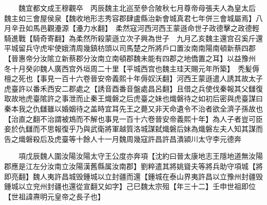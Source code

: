 　　魏宜都文成王穆觀卒　丙辰魏主北巡至參合陂秋七月尊帝母張夫人為皇太后　魏主如三會屋侯泉【魏收地形志秀容郡肆盧縣治新會城真君七年併三會城屬焉】八月辛丑如馬邑觀灅源【灅力水翻】　柔然寇河西河西王蒙遜命世子政德擊之政德輕騎進戰【騎奇寄翻】為柔然所殺蒙遜立次子興為世子　九月乙亥魏主還宫召奚斤還平城留兵守虎牢使娥清周幾鎮枋頭以司馬楚之所將戶口置汝南南陽南頓新蔡四郡【晉惠帝分汝隂立新蔡郡分汝南立南頓郡魏未能有四郡之地僑置之耳】以益豫州　冬十月癸卯魏人廣西宫外垣周二十里【平城西宫也魏主珪天賜元年所築】　秃髪傉檀之死也【事見一百十六卷晉安帝義熙十年傉奴沃翻】河西王蒙遜遣人誘其故太子虎臺許以番禾西安二郡處之【誘音酉番音盤處昌呂翻】且借之兵使伐秦報其父讎復取故地虎臺隂許之事泄而止秦王熾磐之后虎臺之妹也熾磐待之如初后密與虎臺謀曰秦本我之仇讎雖以婚姻待之盖時宜耳先王之薨又非天命遺令不治者欲全濟子孫故也【治直之翻不治謂被鴆而不解也事見一百十六卷晉安帝義熙十年】為人子者豈可臣妾於仇讎而不思報復乎乃與武衛將軍越質洛城謀弑熾磐后妹為熾磐左夫人知其謀而告之熾磐殺后及虎臺等十餘人十一月魏周幾寇許昌許昌潰潁川太守李元德奔

　　項戊辰魏人圍汝陽汝陽太守王公度亦奔項【沈約曰晉太康地志王隱地道無汝陽郡應是江左分汝南立汝陽漢舊縣属汝南郡】劉粹遣其將姚聳夫等將兵助守項城【將即亮翻】魏人夷許昌城毁鍾城以立封疆而還【鍾城在泰山界夷許昌以立豫州封疆毁鍾城以立兖州封疆也還從宣翻又如字】己巳魏太宗殂【年三十二】壬申世祖即位【世祖諱燾明元皇帝之長子也】

